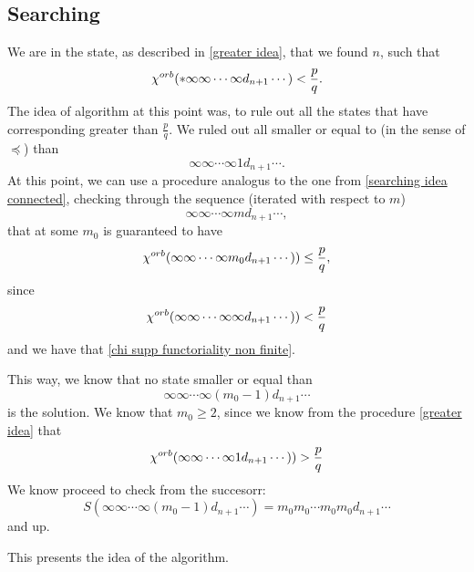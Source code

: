 \subsection{Searching}\label{searching mode idea}
We are in the state, as described in \ref{greater idea}, that we found $n$, such that 
\begin{equation}
{\chi^{orb}(*\infty\infty \cdots \infty d_{n+1}\cdots)} < \frac{p}{q}.
\end{equation}
The idea of algorithm at this point was, to rule out all the states that have 
corresponding \Eoc greater than $\frac{p}{q}$. We ruled out all smaller or equal to
(in the sense of $\preceq$) than 
\begin{equation}
\infty\infty \cdots \infty 1d_{n+1}\cdots.
\end{equation}
At this point, we can use a procedure analogus to the one from 
\ref{searching idea connected}, checking through the sequence (iterated with respect to $m$)
\begin{equation}
\infty\infty \cdots \infty md_{n+1}\cdots,
\end{equation}
that at some $m_0$ is guaranteed to have
\begin{equation}
{\chi^{orb}(\infty\infty \cdots \infty m_0d_{n+1}\cdots))} \leq \frac{p}{q},
\end{equation}
since 
\begin{equation}
{\chi^{orb}(\infty\infty \cdots \infty \infty d_{n+1}\cdots))} < \frac{p}{q}
\end{equation}
and we have that \ref{chi supp functoriality non finite}. 

This way, we know that no state smaller or equal than 
\begin{equation}\label{searching state}
\infty\infty \cdots \infty (m_0-1) d_{n+1}\cdots
\end{equation}
is the solution. 
We know that $m_0 \geq 2$, since we know from  the procedure \ref{greater idea} that 
\begin{equation}
{\chi^{orb}(\infty\infty \cdots \infty 1 d_{n+1}\cdots))} > \frac{p}{q}
\end{equation}
We know proceed to check from the succesorr:
\begin{equation}
S(\infty\infty \cdots \infty (m_0-1) d_{n+1}\cdots) = m_0m_0\cdots m_0 m_0 d_{n+1}\cdots
\end{equation}
and 
up.

This presents the idea of the algorithm.

